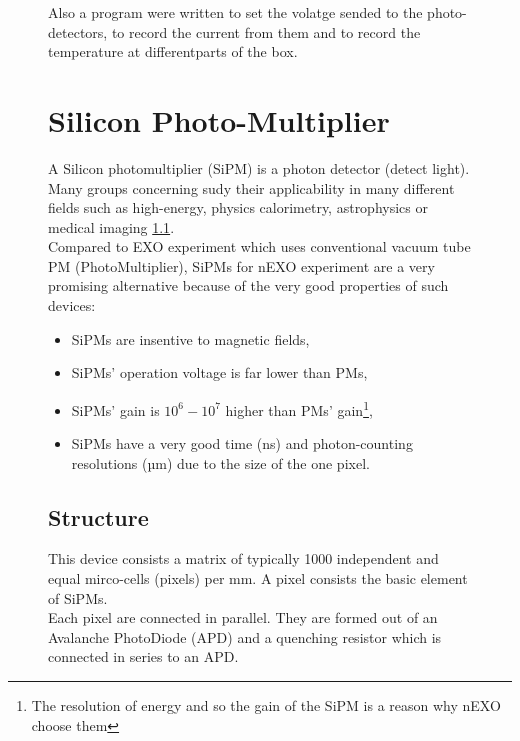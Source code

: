 \documentclass[a4paper, 11pt]{report}%
\begin{document}
\begin{figure}[!hbtp]
  Also a program were written to set the volatge sended to the photo-detectors, to record the current from them and to record the 
  temperature at differentparts of the box. 
  
  \section{Silicon Photo-Multiplier}
  
  A Silicon photomultiplier (SiPM) is a photon detector (detect light). Many groups concerning sudy their applicability in many different 
  fields such as high-energy, physics calorimetry, astrophysics or medical imaging \ref{}.\\
  Compared to EXO experiment which uses conventional vacuum tube PM (PhotoMultiplier), SiPMs for nEXO experiment are a very promising 
  alternative because of the very good properties of such devices:
  
  \begin{itemize}
   \item SiPMs are insentive to magnetic fields,
   \item SiPMs' operation voltage is far lower than PMs,
   \item SiPMs' gain is \(10^6 - 10^7\) higher than PMs' gain\footnote{The resolution of energy and so the gain of the SiPM is a 
   reason why nEXO choose them},
   \item SiPMs have a very good time (ns) and photon-counting resolutions (µm) due to the size of the one pixel.
  \end{itemize}

  
  \subsection{Structure}
  
  This device consists a matrix of typically 1000 independent and equal mirco-cells (pixels) per mm\texttwosuperior{}. A pixel consists the basic 
  element of SiPMs.\\
  Each pixel are connected in parallel. They are formed out of an Avalanche PhotoDiode (APD) and a quenching resistor which is 
  connected in series to an APD. 
  

\end{figure}
\end{document}
